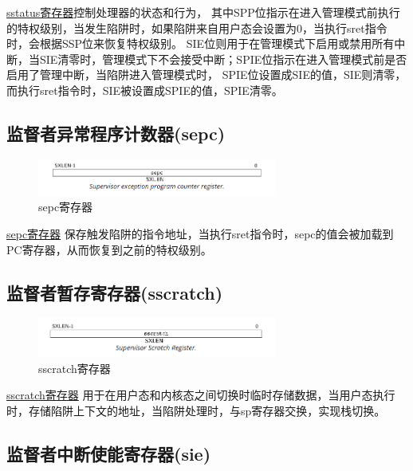 \href{https://five-embeddev.com/riscv-priv-isa-manual/Priv-v1.12/supervisor.html#sstatus}{sstatus寄存器}控制处理器的状态和行为，
其中SPP位指示在进入管理模式前执行的特权级别，当发生陷阱时，如果陷阱来自用户态会设置为0，当执行sret指令时，会根据SSP位来恢复特权级别。
SIE位则用于在管理模式下启用或禁用所有中断，当SIE清零时，管理模式下不会接受中断；SPIE位指示在进入管理模式前是否启用了管理中断，当陷阱进入管理模式时，
SPIE位设置成SIE的值，SIE则清零，而执行sret指令时，SIE被设置成SPIE的值，SPIE清零。

\subsection{监督者异常程序计数器(sepc)}

\begin{figure}[htbp]
    \centering
    \includegraphics[width=0.7\textwidth]{../image/sepc.png}
    \caption{sepc寄存器}
    \label{fig:sepc}
\end{figure}

\href{https://five-embeddev.com/riscv-priv-isa-manual/Priv-v1.12/supervisor.html#supervisor-exception-program-counter-sepc}{sepc寄存器}
保存触发陷阱的指令地址，当执行sret指令时，sepc的值会被加载到PC寄存器，从而恢复到之前的特权级别。

\subsection{监督者暂存寄存器(sscratch)}

\begin{figure}[htbp]
    \centering
    \includegraphics[width=0.7\textwidth]{../image/sscratch.png}
    \caption{sscratch寄存器}
    \label{fig:sscratch}
\end{figure}

\href{https://five-embeddev.com/riscv-priv-isa-manual/Priv-v1.12/supervisor.html#supervisor-scratch-register-sscratch}{sscratch寄存器}
用于在用户态和内核态之间切换时临时存储数据，当用户态执行时，存储陷阱上下文的地址，当陷阱处理时，与sp寄存器交换，实现栈切换。

\subsection{监督者中断使能寄存器(sie)}

